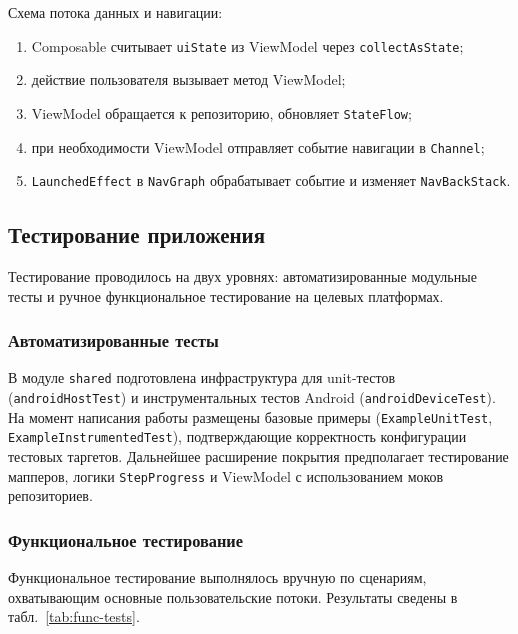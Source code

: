 \documentclass[../main.tex]{subfiles}
\begin{document}
Схема потока данных и навигации:
\begin{enumerate}[leftmargin=*]
	\item Composable считывает \texttt{uiState} из ViewModel через \texttt{collectAsState};
	\item действие пользователя вызывает метод ViewModel;
	\item ViewModel обращается к репозиторию, обновляет \texttt{StateFlow};
	\item при необходимости ViewModel отправляет событие навигации в \texttt{Channel};
	\item \texttt{LaunchedEffect} в \texttt{NavGraph} обрабатывает событие и изменяет \texttt{NavBackStack}.
\end{enumerate}

\subsection{Тестирование приложения}

Тестирование проводилось на двух уровнях: автоматизированные модульные тесты и ручное функциональное тестирование на целевых платформах.

\subsubsection{Автоматизированные тесты}

В модуле \texttt{shared} подготовлена инфраструктура для unit-тестов (\texttt{androidHostTest}) и инструментальных тестов Android (\texttt{androidDeviceTest}). На момент написания работы размещены базовые примеры (\texttt{ExampleUnitTest}, \texttt{ExampleInstrumentedTest}), подтверждающие корректность конфигурации тестовых таргетов. Дальнейшее расширение покрытия предполагает тестирование мапперов, логики \texttt{StepProgress} и ViewModel с использованием моков репозиториев.

\subsubsection{Функциональное тестирование}

Функциональное тестирование выполнялось вручную по сценариям, охватывающим основные пользовательские потоки. Результаты сведены в табл.~\ref{tab:func-tests}.
\end{document}
